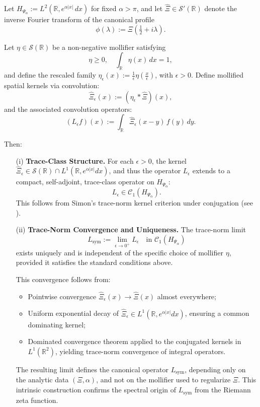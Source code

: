 \begin{lemma}
\label{lem:construction_canonical_data}
Let \( H_{\Psi_\alpha} := L^2(\mathbb{R}, e^{\alpha |x|}\, dx) \) for fixed \( \alpha > \pi \), and let \( \widehat{\Xi} \in \mathcal{S}'(\mathbb{R}) \) denote the inverse Fourier transform of the canonical profile
\[
\phi(\lambda) := \Xi\left( \tfrac{1}{2} + i\lambda \right).
\]

Let \( \eta \in \mathcal{S}(\mathbb{R}) \) be a non-negative mollifier satisfying
\[
\eta \ge 0, \quad \int_{\mathbb{R}} \eta(x)\, dx = 1,
\]
and define the rescaled family \( \eta_\epsilon(x) := \frac{1}{\epsilon} \eta\left( \frac{x}{\epsilon} \right) \), with \( \epsilon > 0 \). Define mollified spatial kernels via convolution:
\[
\widehat{\Xi}_\epsilon(x) := (\eta_\epsilon * \widehat{\Xi})(x),
\]
and the associated convolution operators:
\[
(L_\epsilon f)(x) := \int_{\mathbb{R}} \widehat{\Xi}_\epsilon(x - y)\, f(y)\, dy.
\]

Then:
\begin{enumerate}
  \item[\textnormal{(i)}] \textbf{Trace-Class Structure.} For each \( \epsilon > 0 \), the kernel \( \widehat{\Xi}_\epsilon \in \mathcal{S}(\mathbb{R}) \cap L^1(\mathbb{R}, e^{\alpha |x|} dx) \), and thus the operator \( L_\epsilon \) extends to a compact, self-adjoint, trace-class operator on \( H_{\Psi_\alpha} \):
  \[
  L_\epsilon \in \mathcal{C}_1(H_{\Psi_\alpha}).
  \]
  This follows from Simon’s trace-norm kernel criterion under conjugation (see \cite[Thm.~3.1]{Simon2005TraceIdeals}).

  \item[\textnormal{(ii)}] \textbf{Trace-Norm Convergence and Uniqueness.} The trace-norm limit
  \[
  L_{\mathrm{sym}} := \lim_{\epsilon \to 0^+} L_\epsilon \quad \text{in } \mathcal{C}_1(H_{\Psi_\alpha})
  \]
  exists uniquely and is independent of the specific choice of mollifier \( \eta \), provided it satisfies the standard conditions above.

  This convergence follows from:
  \begin{itemize}
    \item Pointwise convergence \( \widehat{\Xi}_\epsilon(x) \to \widehat{\Xi}(x) \) almost everywhere;
    \item Uniform exponential decay of \( \widehat{\Xi}_\epsilon \in L^1(\mathbb{R}, e^{\alpha |x|} dx) \), ensuring a common dominating kernel;
    \item Dominated convergence theorem applied to the conjugated kernels in \( L^1(\mathbb{R}^2) \), yielding trace-norm convergence of integral operators.
  \end{itemize}

  The resulting limit defines the canonical operator \( L_{\mathrm{sym}} \), depending only on the analytic data \( (\Xi, \alpha) \), and not on the mollifier used to regularize \( \widehat{\Xi} \). This intrinsic construction confirms the spectral origin of \( L_{\mathrm{sym}} \) from the Riemann zeta function.
\end{enumerate}
\end{lemma}
